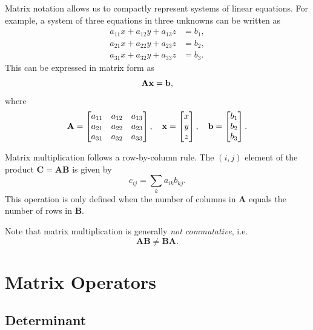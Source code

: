 Matrix notation allows us to compactly represent systems of linear equations.
For example, a system of three equations in three unknowns can be written as
\begin{align}
    a_{11} x + a_{12} y + a_{13} z &= b_1 ,\\
    a_{21} x + a_{22} y + a_{23} z &= b_2 ,\\
    a_{31} x + a_{32} y + a_{33} z &= b_3 .
\end{align}
This can be expressed in matrix form as
\begin{equation}
    \mathbf{A} \vb{x} = \vb{b},
\end{equation}
where
\begin{equation}
    \mathbf{A} =
    \begin{bmatrix}
        a_{11} & a_{12} & a_{13} \\
        a_{21} & a_{22} & a_{23} \\
        a_{31} & a_{32} & a_{33}
    \end{bmatrix}, \quad
    \vb{x} =
    \begin{bmatrix}
        x \\ y \\ z
    \end{bmatrix}, \quad
    \vb{b} =
    \begin{bmatrix}
        b_1 \\ b_2 \\ b_3
    \end{bmatrix}.
\end{equation}

Matrix multiplication follows a row-by-column rule. The $(i,j)$ element of the
product $\mathbf{C} = \mathbf{A}\mathbf{B}$ is given by
\begin{equation}
    c_{ij} = \sum_{k} a_{ik} b_{kj}.
\end{equation}
This operation is only defined when the number of columns in $\mathbf{A}$ equals
the number of rows in $\mathbf{B}$.

Note that matrix multiplication is generally \emph{not commutative}, i.e.
\begin{equation}
    \mathbf{A}\mathbf{B} \neq \mathbf{B}\mathbf{A}.
\end{equation}


\section{Matrix Operators}

\subsection{Determinant}

